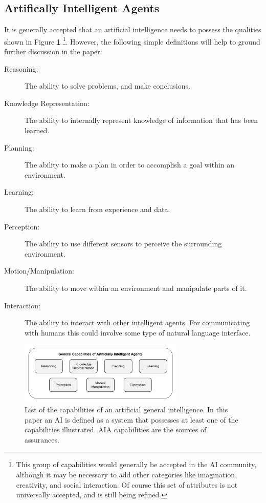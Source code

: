 \subsection{Artifically Intelligent Agents} \label{sec:aias}
    It is generally accepted that an artificial intelligence needs to possess the qualities shown in Figure \ref{fig:AIcapabilities} \cite{Russell2010-wv,Nilsson2009-rp,Luger2008-vf}\footnote{This group of capabilities would generally be accepted in the AI community, although it may be necessary to add other categories like imagination, creativity, and social interaction. Of course this set of attributes is not universally accepted, and is still being refined.}. However, the following simple definitions will help to ground further discussion in the paper:

    \begin{description}
        \item [Reasoning:] The ability to solve problems, and make conclusions.
        \item [Knowledge Representation:] The ability to internally represent knowledge of information that has been learned.
        \item [Planning:] The ability to make a plan in order to accomplish a goal within an environment.
        \item [Learning:] The ability to learn from experience and data.
        \item [Perception:] The ability to use different sensors to perceive the surrounding environment.
        \item [Motion/Manipulation:] The ability to move within an environment and manipulate parts of it.
        \item [Interaction:] The ability to interact with other intelligent agents. For communicating with humans this could involve some type of natural language interface.
    \end{description}

	\begin{figure}[htbp]
    	\centering
     	\includegraphics[width=0.7\textwidth]{Figures/AI_capabilities}
    	\caption{List of the capabilities of an artificial general intelligence. In this paper an AI is defined as a system that possesses at least one of the capabilities illustrated. AIA capabilities are the sources of assurances.}
        \label{fig:AIcapabilities}
    \end{figure}

